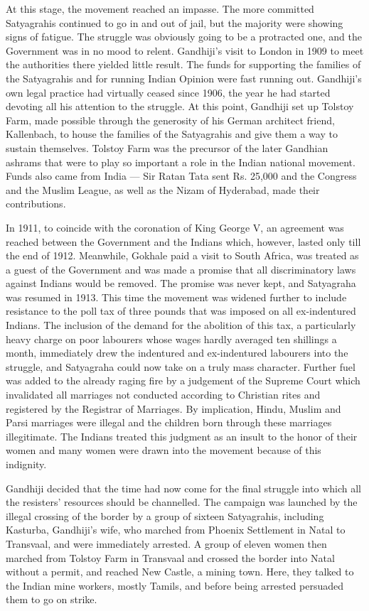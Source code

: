 At this stage, the movement reached an impasse. The more committed Satyagrahis continued to go in and out of jail, but the majority were showing signs of fatigue. The struggle was obviously going to be a protracted one, and the Government was in no mood to relent. Gandhiji's visit to London in 1909 to meet the authorities there yielded little result. The funds for supporting the families of the Satyagrahis and for running Indian Opinion were fast running out. Gandhiji's own legal practice had virtually ceased since 1906, the year he had started devoting all his attention to the struggle. At this point, Gandhiji set up Tolstoy Farm, made possible through the generosity of his German architect friend, Kallenbach, to house the families of the Satyagrahis and give them a way to sustain themselves. Tolstoy Farm was the precursor of the later Gandhian ashrams that were to play so important a role in the Indian national movement. Funds also came from India --- Sir Ratan Tata sent Rs. 25,000 and the Congress and the Muslim League, as well as the Nizam of Hyderabad, made their contributions.

In 1911, to coincide with the coronation of King George V, an agreement was reached between the Government and the Indians which, however, lasted only till the end of 1912. Meanwhile, Gokhale paid a visit to South Africa, was treated as a guest of the Government and was made a promise that all discriminatory laws against Indians would be removed. The promise was never kept, and Satyagraha was resumed in 1913. This time the movement was widened further to include resistance to the poll tax of three pounds that was imposed on all ex-indentured Indians. The inclusion of the demand for the abolition of this tax, a particularly heavy charge on poor labourers whose wages hardly averaged ten shillings a month, immediately drew the indentured and ex-indentured labourers into the struggle, and Satyagraha could now take on a truly mass character. Further fuel was added to the already raging fire by a judgement of the Supreme Court which invalidated all marriages not conducted according to Christian rites and registered by the Registrar of Marriages. By implication, Hindu, Muslim and Parsi marriages were illegal and the children born through these marriages illegitimate. The Indians treated this judgment as an insult to the honor of their women and many women were drawn into the movement because of this indignity.

Gandhiji decided that the time had now come for the final struggle into which all the resisters' resources should be channelled. The campaign was launched by the illegal crossing of the border by a group of sixteen Satyagrahis, including Kasturba, Gandhiji's wife, who marched from Phoenix Settlement in Natal to Transvaal, and were immediately arrested. A group of eleven women then marched from Tolstoy Farm in Transvaal and crossed the border into Natal without a permit, and reached New Castle, a mining town. Here, they talked to the Indian mine workers, mostly Tamils, and before being arrested persuaded them to go on strike.

